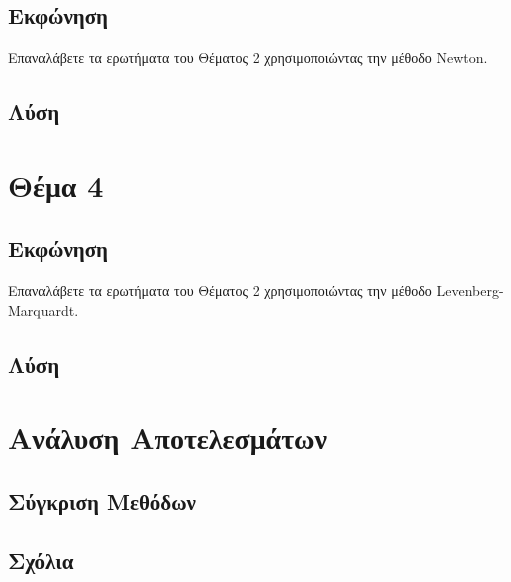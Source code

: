 \documentclass{report}
\begin{document}
\section{Εκφώνηση}
Επαναλάβετε τα ερωτήματα του Θέματος 2 χρησιμοποιώντας την μέθοδο 
Newton.
\section{Λύση}


\chapter{Θέμα 4}
\section{Εκφώνηση}
Επαναλάβετε τα ερωτήματα του Θέματος 2 χρησιμοποιώντας την μέθοδο 
Levenberg-Marquardt.
\section{Λύση}


\chapter{Ανάλυση Αποτελεσμάτων}
\section{Σύγκριση Μεθόδων}

\section{Σχόλια}


\nocite{*} %


\end{document}
